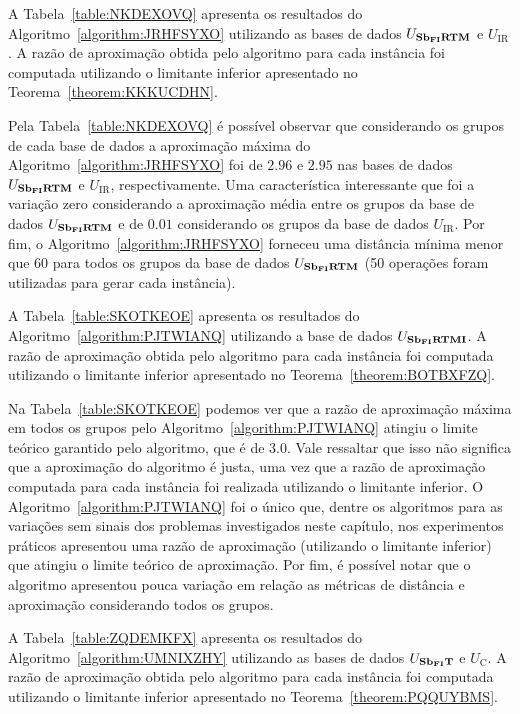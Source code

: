 A Tabela~\ref{table:NKDEXOVQ} apresenta os resultados do Algoritmo~\ref{algorithm:JRHFSYXO} utilizando as bases de dados $U_{\textbf{Sb\textsubscript{FI}RTM}}{}$ e $U_{\text{IR}}$. A razão de aproximação obtida pelo algoritmo para cada instância foi computada utilizando o limitante inferior apresentado no Teorema~\ref{theorem:KKKUCDHN}.



% 

Pela Tabela~\ref{table:NKDEXOVQ} é possível observar que considerando os grupos de cada base de dados a aproximação máxima do Algoritmo~\ref{algorithm:JRHFSYXO} foi de $2.96$ e $2.95$ nas bases de dados $U_{\textbf{Sb\textsubscript{FI}RTM}}{}$ e $U_{\text{IR}}$, respectivamente. Uma característica interessante que foi a variação zero considerando a aproximação média entre os grupos da base de dados $U_{\textbf{Sb\textsubscript{FI}RTM}}{}$ e de $0.01$ considerando os grupos da base de dados $U_{\text{IR}}$. Por fim, o Algoritmo~\ref{algorithm:JRHFSYXO} forneceu uma distância mínima menor que $60$ para todos os grupos da base de dados $U_{\textbf{Sb\textsubscript{FI}RTM}}{}$ (50 operações foram utilizadas para gerar cada instância).

A Tabela~\ref{table:SKOTKEOE} apresenta os resultados do Algoritmo~\ref{algorithm:PJTWIANQ} utilizando a base de dados $U_{\textbf{Sb\textsubscript{FI}RTMI}}{}$. A razão de aproximação obtida pelo algoritmo para cada instância foi computada utilizando o limitante inferior apresentado no Teorema~\ref{theorem:BOTBXFZQ}.



Na Tabela~\ref{table:SKOTKEOE} podemos ver que a razão de aproximação máxima em todos os grupos pelo Algoritmo~\ref{algorithm:PJTWIANQ} atingiu o limite teórico garantido pelo algoritmo, que é de $3.0$. Vale ressaltar que isso não significa que a aproximação do algoritmo é justa, uma vez que a razão de aproximação computada para cada instância foi realizada utilizando o limitante inferior. O Algoritmo~\ref{algorithm:PJTWIANQ} foi o único que, dentre os algoritmos para as variações sem sinais dos problemas investigados neste capítulo, nos experimentos práticos apresentou uma razão de aproximação (utilizando o limitante inferior) que atingiu o limite teórico de aproximação. Por fim, é possível notar que o algoritmo apresentou pouca variação em relação as métricas de distância e aproximação considerando todos os grupos.

A Tabela~\ref{table:ZQDEMKFX} apresenta os resultados do Algoritmo~\ref{algorithm:UMNIXZHY} utilizando as bases de dados $U_{\textbf{Sb\textsubscript{FI}T}}{}$ e $U_{\text{C}}$. A razão de aproximação obtida pelo algoritmo para cada instância foi computada utilizando o limitante inferior apresentado no Teorema~\ref{theorem:PQQUYBMS}.

